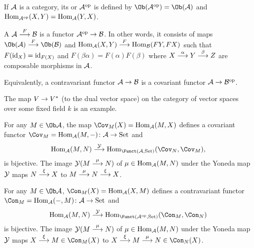 \documentclass[a4paper,parskip=half,numbers=enddot, DIV=12]{scrreprt}
\begin{document}
  \begin{defi}
  	\begin{alphanumerate}
  		\item If $\mathcal{A}$ is a category, its  or  $\mathcal{A}^{\mathrm{op}}$ is defined by  $\Ob(\Aa^\op) = \Ob(\Aa)$ and $\operatorname{Hom}_{\mathcal{A}^{\mathrm{op}}}(X,Y) = \operatorname{Hom}_{\mathcal{A}}(Y,X)$.
  		\item A  $\Aa\morphism[F]\Bb$ is a functor $\Aa^\op\morphism \Bb$. In other words, it consists of maps $\Ob(\Aa)\morphism[F]\Ob(\Bb)$ and $\Hom_\Aa(X,Y) \morphism[F] \Hom_\Bb(FY, FX)$ such that $F(\operatorname{id}_X) = \operatorname{id}_{F(X)}$ and $F(\beta\alpha)  = F(\alpha)F(\beta)$ where $X\morphism[\alpha]Y\morphism[\beta] Z$ are composable morphisms in $\mathcal{A}$.
  	\end{alphanumerate}
  \end{defi}
  \begin{rem*}
  	\begin{alphanumerate}
  		\item 
  		Equivalently, a contravariant functor $\Aa\morphism \Bb$ is a covariant functor $\Aa\morphism \Bb^\op$.
  		\item
  		The map $V\morphism V^\ast$ (to the dual vector space) on the category of vector spaces over some fixed field $k$ is an example.
  	\end{alphanumerate}
  \end{rem*}
  \begin{lem}
  	For any $M\in\Ob \Aa$, the map $\Cov_M(X) = \Hom_\Aa(M,X)$ defines a covariant functor $\Cov_M=\Hom_\Aa(M,-)\colon \Aa\morphism \cat{Set}$ and 
  	\begin{align*}
  	\Hom_\Aa(M,N) \morphism[\Yy] \Hom_{\Funct(\Aa,\cat{Set})} (\Cov_N, \Cov_M),
  	\end{align*}
  	is bijective. The image $\Yy(M\morphism[\mu]N)$ of $\mu\in\operatorname{Hom}_{\mathcal{A}}(M,N)$ under the Yoneda map $\mathcal{Y}$ maps $N\morphism[\xi]X$ to $M\morphism[\mu]N\morphism[\xi]X$.
  \end{lem}
  \begin{lem} 
  	For any $M\in\Ob \Aa$, $\Con_M(X) = \Hom_\Aa(X,M)$ defines a contravariant functor $\Con_M=\Hom_\Aa(-,M)\colon \Aa\morphism \cat{Set}$ and 
  	\begin{align*}
  	\Hom_\Aa(M,N) \morphism[\Yy] \Hom_{\Funct(\Aa^\op,\cat{Set})}(\Con_M,\Con_N)
  	\end{align*}
  	is bijective. The image $\Yy(M\morphism[\mu]N)$ of $\mu\in\operatorname{Hom}_{\mathcal{A}}(M,N)$ under the Yoneda map $\mathcal{Y}$ maps $X\morphism[\xi]M\in\Con_M(X)$ to $X\morphism[\xi]M\morphism[\mu]N\in\Con_N(X)$.
  \end{lem}
\end{document}
